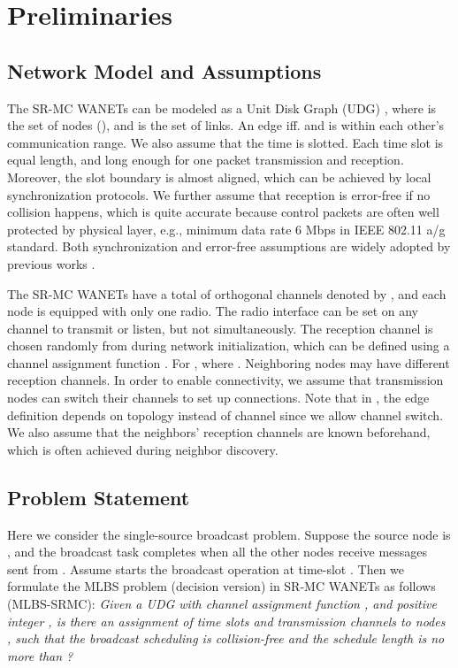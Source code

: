 \documentclass[10pt, conference]{IEEEtran}
\begin{document}
\section{Preliminaries} \label{pre}
\subsection{Network Model and Assumptions}
The SR-MC WANETs can be modeled as a Unit Disk Graph (UDG) , where  is the set of nodes (), and  is
the set of links. An edge  iff.  and  is
within each other's communication range. We also assume that
the time is slotted. Each time slot is equal length, and long
enough for one packet transmission and reception. Moreover, the
slot boundary is almost aligned, which can be achieved by local
synchronization protocols. We further assume that reception is
error-free if no collision happens, which is quite accurate
because control packets are often well protected by physical
layer, e.g., minimum data rate 6 Mbps in IEEE 802.11 a/g
standard. Both synchronization and error-free assumptions are
widely adopted by previous works \cite{info09, info07, ICDCN10,
MR-MC, UDG}.

The SR-MC WANETs have a total of  orthogonal channels
denoted by , and each node is equipped with
only one radio. The radio interface can be set on any channel
to transmit or listen, but not simultaneously. The reception
channel is chosen randomly from  during network
initialization, which can be defined using a channel assignment
function . For ,  where .
Neighboring nodes may have different reception channels. In
order to enable connectivity, we assume that transmission nodes
can switch their channels to set up connections. Note
that in , the edge definition depends on topology
instead of channel since we allow channel switch. We also
assume that the neighbors' reception channels are known
beforehand, which is often achieved during neighbor discovery.



\subsection{Problem Statement}
Here we consider the single-source broadcast problem. Suppose
the source node is , and the broadcast task completes when
all the other nodes receive messages sent from . Assume 
starts the broadcast operation at time-slot . Then we
formulate the MLBS problem (decision version) in SR-MC WANETs
as follows (MLBS-SRMC): \emph{Given a UDG  with
channel assignment function , and positive integer , is
there an assignment of time slots and transmission channels to
nodes , such that the broadcast scheduling is
collision-free and the schedule length is no more than ?}
\end{document}
